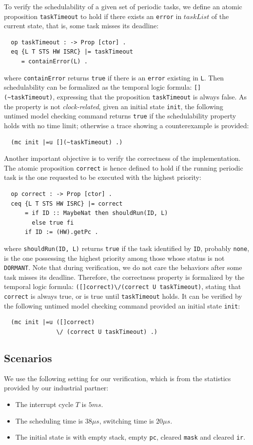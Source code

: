 \documentclass[12pt,onecolumn]{IEEEtranTIE}
\begin{document}
To verify the schedulability of a given set of periodic tasks, we
define an atomic proposition \verb|taskTimeout| to hold if there
exists an \verb|error| in $\mathit{taskList}$ of the current state,
that is, some task misses its deadline:
\begin{verbatim}
  op taskTimeout : -> Prop [ctor] .
  eq {L T STS HW ISRC} |= taskTimeout 
     = containError(L) .
\end{verbatim}
where \verb|containError| returns \verb|true| if there is an
\verb|error| existing in \verb|L|. Then schedulability can be
formalized as the temporal logic formula: \verb|[](~taskTimeout)|,
expressing that the proposition \verb|taskTimeout| is always false. As
the property is not \emph{clock-related}, given an initial state
\verb|init|, the following untimed model checking command returns
\verb|true| if the schedulability property holds with no time limit;
otherwise a trace showing a counterexample is provided:
\begin{verbatim}
  (mc init |=u [](~taskTimeout) .)
\end{verbatim}

Another important objective is to verify the correctness of the
implementation.  The atomic proposition \verb|correct| is hence
defined to hold if the running periodic task is the one requested to
be executed with the highest priority:
\begin{verbatim}
  op correct : -> Prop [ctor] .
  ceq {L T STS HW ISRC} |= correct
      = if ID :: MaybeNat then shouldRun(ID, L)
        else true fi
      if ID := (HW).getPc .
\end{verbatim}
where \verb|shouldRun(ID, L)| returns \verb|true| if the task
identified by \verb|ID|, probably \verb|none|, is the one possessing
the highest priority among those whose status is not
\verb|DORMANT|. Note that during verification, we do not care the
behaviors after some task misses its deadline. Therefore, the
correctness property is formalized by the temporal logic formula:
\verb|([]correct)\/(correct U taskTimeout)|, stating that
\verb|correct| is always true, or is true until \verb|taskTimeout|
holds. It can be verified by the following untimed model checking
command provided an initial state \verb|init|:
\begin{verbatim}
  (mc init |=u ([]correct) 
               \/ (correct U taskTimeout) .)
\end{verbatim}

\subsection{Scenarios}
\label{ss:results}
We use the following setting for our verification, which is from the 
statistics provided by our industrial partner:
\begin{itemize}
\item The interrupt cycle $T$ is $5ms$.
\item The scheduling time is $38{\mu}s$, switching time is $20{\mu}s$.
\item The initial state is with empty stack, empty \verb|pc|, cleared 
\verb|mask| and cleared \verb|ir|.
\end{itemize}
\end{document}
